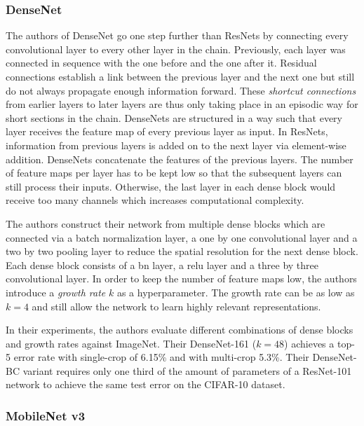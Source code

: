 \documentclass[final]{vutinfth} %
\begin{document}
\subsubsection{DenseNet}
\label{sssec:theory-densenet}

The authors of DenseNet \cite{huang2017} go one step further than
ResNets by connecting every convolutional layer to every other layer
in the chain. Previously, each layer was connected in sequence with
the one before and the one after it. Residual connections establish a
link between the previous layer and the next one but still do not
always propagate enough information forward. These \emph{shortcut
connections} from earlier layers to later layers are thus only taking
place in an episodic way for short sections in the chain. DenseNets
are structured in a way such that every layer receives the feature map
of every previous layer as input. In ResNets, information from
previous layers is added on to the next layer via element-wise
addition. DenseNets concatenate the features of the previous
layers. The number of feature maps per layer has to be kept low so
that the subsequent layers can still process their inputs. Otherwise,
the last layer in each dense block would receive too many channels
which increases computational complexity.

The authors construct their network from multiple dense blocks which
are connected via a batch normalization layer, a one by one
convolutional layer and a two by two pooling layer to reduce the
spatial resolution for the next dense block. Each dense block consists
of a \gls{bn} layer, a \gls{relu} layer and a three by three
convolutional layer. In order to keep the number of feature maps low,
the authors introduce a \emph{growth rate} $k$ as a
hyperparameter. The growth rate can be as low as $k=4$ and still allow
the network to learn highly relevant representations.

In their experiments, the authors evaluate different combinations of
dense blocks and growth rates against ImageNet. Their DenseNet-161
($k=48$) achieves a top-5 error rate with single-crop of 6.15\% and
with multi-crop 5.3\%. Their DenseNet-BC variant requires only one
third of the amount of parameters of a ResNet-101 network to achieve
the same test error on the CIFAR-10 dataset.

\subsubsection{MobileNet v3}
\label{sssec:theory-mobilenet-v3}
\end{document}
